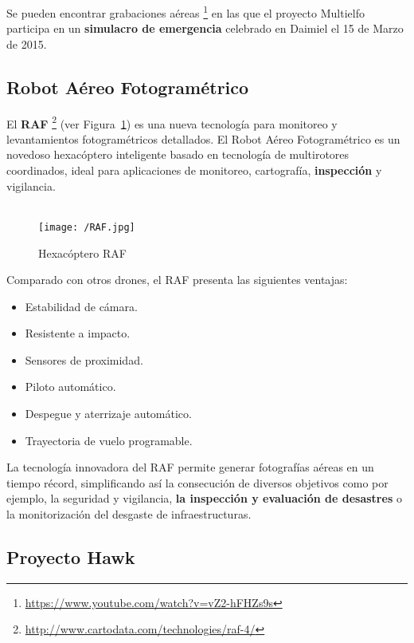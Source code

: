 Se pueden encontrar grabaciones aéreas \footnote{\url{https://www.youtube.com/watch?v=vZ2-hFHZs9s}} en las que el proyecto Multielfo participa en un \textbf{simulacro de emergencia} celebrado en Daimiel el 15 de Marzo de 2015.

\subsection{Robot Aéreo Fotogramétrico}
\label{sec:raf}

El \textbf{\acs{RAF}} \footnote{\url{http://www.cartodata.com/technologies/raf-4/}} (ver Figura~\ref{fig:raf}) es una nueva tecnología para monitoreo y levantamientos fotogramétricos detallados. El Robot Aéreo Fotogramétrico es un novedoso hexacóptero inteligente basado en tecnología de multirotores coordinados, ideal para aplicaciones de monitoreo, cartografía, \textbf{inspección} y vigilancia. \\ \\

\begin{figure}[!h]
\begin{center}
\texttt{[image: /RAF.jpg]}
\caption[Hexacóptero \acs{RAF}]{Hexacóptero \acs{RAF}}
\label{fig:raf}
\end{center}
\end{figure}

Comparado con otros drones, el \acs{RAF} presenta las siguientes ventajas:
\begin{itemize}
\item Estabilidad de cámara.
\item Resistente a impacto.
\item Sensores de proximidad.
\item Piloto automático.
\item Despegue y aterrizaje automático.
\item Trayectoria de vuelo programable.
\end{itemize}

La tecnología innovadora del \acs{RAF} permite generar fotografías aéreas en un tiempo récord, simplificando así la consecución de diversos objetivos como por ejemplo, la seguridad y vigilancia, \textbf{la inspección y evaluación de desastres} o la monitorización del desgaste de infraestructuras.

\subsection{Proyecto Hawk}
\label{sec:hawk}

